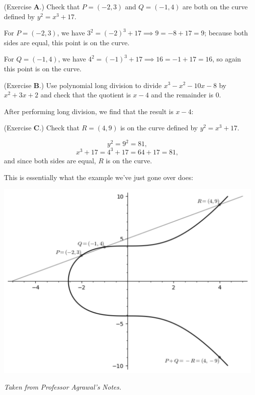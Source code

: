 \documentclass[letterpaper]{article}
\begin{document}
\begin{mdframed}
    (Exercise \textbf{A}.) Check that $P = (-2, 3)$ and $Q = (-1, 4)$ are both on the curve defined by $y^2 = x^3 + 17$. 

    \begin{mdframed}
        For $P = (-2, 3)$, we have $3^2 = (-2)^3 + 17 \implies 9 = -8 + 17 = 9$; because both sides are equal, this point is on the curve. 

        \bigskip 

        For $Q = (-1, 4)$, we have $4^2 = (-1)^3 + 17 \implies 16 = -1 + 17 = 16$, so again this point is on the curve.
    \end{mdframed}
\end{mdframed}

\begin{mdframed}
    (Exercise \textbf{B}.) Use polynomial long division to divide $x^3 - x^2 - 10x - 8$ by $x^2 + 3x + 2$ and check that the quotient is $x - 4$ and the remainder is 0.

    \begin{mdframed}
        After performing long division, we find that the result is $x - 4$: 

        \smallskip 

    \end{mdframed}
\end{mdframed}

\begin{mdframed}
    (Exercise \textbf{C}.) Check that $R = (4, 9)$ is on the curve defined by $y^2 = x^3 + 17$. 

    \begin{mdframed}
        \[y^2 = 9^2 = 81,\]
        \[x^3 + 17 = 4^3 + 17 = 64 + 17 = 81,\]
        and since both sides are equal, $R$ is on the curve.
    \end{mdframed}
\end{mdframed}

This is essentially what the example we've just gone over does: 
\begin{center}
    \includegraphics[scale=0.3]{../assets/weiers_3.png}

    \emph{Taken from Professor Agrawal's Notes.}
\end{center}
\end{document}
